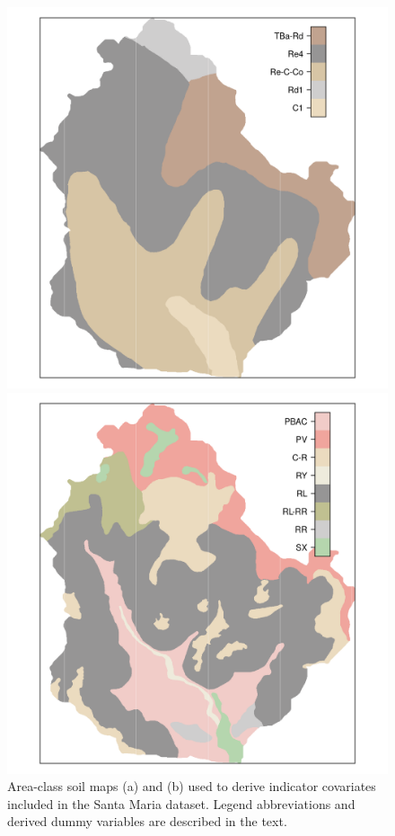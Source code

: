 \begin{figure}[!ht]
\centering
\begin{minipage}[b]{0.45\textwidth}
\subcaption{}
\centering
\includegraphics[width = \textwidth]{fig/chap05-soil-old}
\end{minipage}
\begin{minipage}[b]{0.45\textwidth}
\subcaption{}
\centering
\includegraphics[width = \textwidth]{fig/chap05-soil-new}
\end{minipage} 
\caption[Area-class soil maps included in the Santa Maria dataset.]{Area-class soil maps (a) \soilOld{} and (b) 
\soilNew{} used to derive indicator covariates included in the Santa Maria dataset. Legend abbreviations and 
derived dummy variables are described in the text.}
\label{fig:chap05-soil-maps}
\end{figure}

